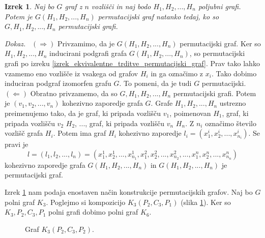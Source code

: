 \documentclass[a4paper, 12pt]{book}
\newtheorem{izrek}{Izrek}[chapter]
\newenvironment{dokaz}{\emph{Dokaz.}\ }{\hspace{\fill}{$\Box$}}
\begin{document}
\begin{izrek}
\label{izrek_konstrukcija_permutacijskega_grafa}
    Naj bo $G$ graf z $n$ vozlišči in naj bodo $H_1, H_2, ..., H_n$ poljubni grafi. Potem je $G(H_1, H_2, ..., H_n)$ permutacijski graf natanko tedaj, ko so $G, H_1, H_2, ..., H_n$ permutacijski grafi.
\end{izrek}
\begin{dokaz}
    $(\Rightarrow)$ Privzamimo, da je $G(H_1, H_2, ..., H_n)$ permutacijski graf. Ker so $H_1, H_2, ..., H_n$ inducirani podgrafi grafa $G(H_1, H_2, ..., H_n)$, so permutacijski grafi po izreku \ref{izrek_ekvivalentne_trditve_permutacijski_graf}. Prav tako lahko vzamemo eno vozlišče iz vsakega od grafov $H_i$ in ga označimo z $x_i$. Tako dobimo induciran podgraf izomorfen grafu $G$. To pomeni, da je tudi $G$ permutacijski. $(\Leftarrow)$ Obratno privzamemo, da so $G, H_1, H_2, ..., H_n$ permutacijski grafi. Potem je $(v_1, v_2, ..., v_n)$ kohezivno zaporedje grafa $G$. Grafe $H_1, H_2, ..., H_n$ ustrezno preimenujemo tako, da je graf, ki pripada vozlišču $v_1$, poimenovan $H_1$, graf, ki pripada vozlišču $v_2$ $H_2$, ..., graf, ki pripada vozlišču $v_n$ $H_n$. Z $n_i$ označimo število vozlišč grafa $H_i$. Potem ima graf $H_i$ kohezivno zaporedje $l_i = (x_1^i, x_2^i, ..., x_{n_i}^i)$. Se pravi je 
    \[
        l = (l_1, l_2, ..., l_n) = (x_1^1, x_2^1, ..., x_{n_1}^1, x_1^2, x_2^2, ..., x_{n_2}^2, ..., x_1^n, x_2^n, ..., x_{n_n}^n)
    \]
    kohezivno zaporedje grafa $G(H_1, H_2, ..., H_n)$ in $G(H_1, H_2, ..., H_n)$ je permutacijski graf.
\end{dokaz}

Izrek \ref{izrek_konstrukcija_permutacijskega_grafa} nam podaja enostaven način konstrukcije permutacijskih grafov. Naj bo $G$ polni graf $K_3$. Poglejmo si kompozicijo $K_3(P_2, C_3, P_1)$ (slika \ref{graf_kompozicija_primer2}). Ker so $K_3, P_2, C_3, P_1$ polni grafi dobimo polni graf $K_6$.

\begin{figure}[h]
    \begin{center}        
    \end{center}
    \caption{Graf $K_3(P_2, C_3, P_2)$.}
    \label{graf_kompozicija_primer2}
\end{figure}
\end{document}
